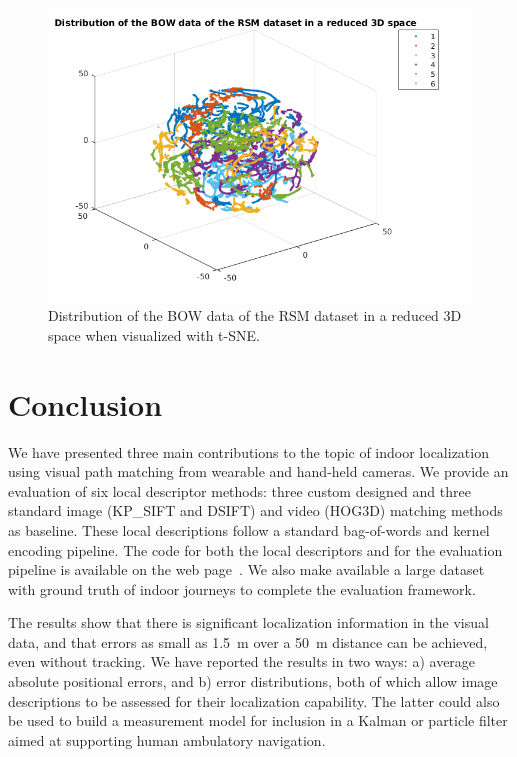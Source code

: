 \begin{figure}
\centering
\includegraphics[width=\textwidth]{gfx/Chapter04/visual_paths.png}
\caption{Distribution of the BOW data of the RSM dataset in a reduced 3D space when visualized with t-SNE.}
\label{fig:tsne3d}
\end{figure}


\section{Conclusion}

We have presented three main contributions to the topic of indoor localization using visual path matching from wearable and hand-held cameras. We provide an evaluation of six local descriptor methods: three custom designed and three standard image (KP\_SIFT and DSIFT) and video (HOG3D) matching methods as baseline. These local descriptions follow a standard bag-of-words and kernel encoding pipeline. The code for both the local descriptors and for the evaluation pipeline is available on the web page~\cite{Rivera-Rubio2014}. We also make available a large dataset with ground truth of indoor journeys to complete the evaluation framework.

The results show that there is significant localization information in the visual data, and that errors as small as \SI{1.5}{m} over a \SI{50}{m} distance can be achieved, even without tracking. We have reported the results in two ways: a) average absolute positional errors, and b) error distributions, both of which allow image descriptions to be assessed for their localization capability.  The latter could also be used to build a measurement model for inclusion in a Kalman or particle filter  aimed at supporting human ambulatory navigation. 

